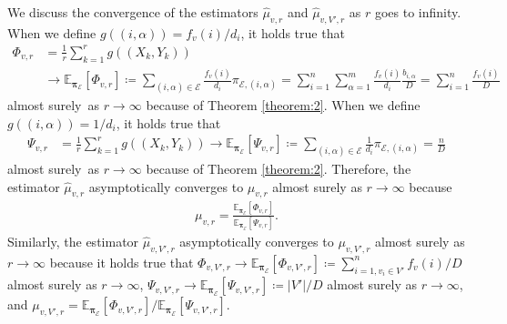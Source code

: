We discuss the convergence of the estimators $\hat{\mu}_{v, r}$ and $\hat{\mu}_{v, V', r}$ as $r$ goes to infinity.
When we define $g((i, \alpha)) = f_v(i) / d_i$, it holds true that
\begin{align*}
\Phi_{v, r} &= \frac{1}{r} \sum_{k=1}^r g((X_k, Y_k)) \\
&\to \mathbb{E}_{\bm{\pi}_{\mathcal{E}}}[\Phi_{v, r}] \coloneq \sum_{(i, \alpha) \in \mathcal{E}} \frac{f_v(i)}{d_i} \pi_{\mathcal{E}, (i, \alpha)} = \sum_{i=1}^n \sum_{\alpha=1}^m \frac{f_v(i)}{d_i} \frac{b_{i, \alpha}}{D} =
\sum_{i=1}^n \frac{f_v(i)}{D}
\end{align*}
almost surely\ as $r \to \infty$ because of Theorem \ref{theorem:2}. 
When we define $g((i, \alpha)) = 1 / d_i$, it holds true that
\begin{align*}
\Psi_{v, r} &= \frac{1}{r} \sum_{k=1}^r g((X_k, Y_k)) \to \mathbb{E}_{\bm{\pi}_{\mathcal{E}}}[\Psi_{v, r}] \coloneq \sum_{(i, \alpha) \in \mathcal{E}} \frac{1}{d_i} \pi_{\mathcal{E}, (i, \alpha)} = \frac{n} {D}
\end{align*}
almost surely\ as $r \to \infty$ because of Theorem \ref{theorem:2}.
Therefore, the estimator $\hat{\mu}_{v, r}$ asymptotically converges to $\mu_{v, r}$ almost surely as $r \to \infty$ because 
\begin{align*}
\mu_{v, r} = \frac{\mathbb{E}_{\bm{\pi}_{\mathcal{E}}}[\Phi_{v, r}]}{\mathbb{E}_{\bm{\pi}_{\mathcal{E}}}[\Psi_{v, r}]}.
\end{align*}
Similarly, the estimator $\hat{\mu}_{v, V', r}$ asymptotically converges to $\mu_{v, V', r}$ almost surely as $r \to \infty$ because it holds true that $\Phi_{v, V', r} \to \mathbb{E}_{\bm{\pi}_{\mathcal{E}}}[\Phi_{v, V', r}] \coloneq \sum_{i=1, v_i \in V'}^n f_v(i) / D$ almost surely as $r \to \infty$, $\Psi_{v, V', r} \to \mathbb{E}_{\bm{\pi}_{\mathcal{E}}}[\Psi_{v, V', r}] \coloneq |V'| / D$ almost surely as $r \to \infty$, and $\mu_{v, V', r} = \mathbb{E}_{\bm{\pi}_{\mathcal{E}}}[\Phi_{v, V', r}] / \mathbb{E}_{\bm{\pi}_{\mathcal{E}}}[\Psi_{v, V', r}]$.

